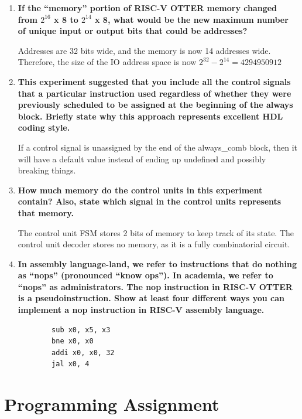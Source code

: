 \documentclass{article}
\begin{document}
\begin{enumerate}
    \item \textbf{If the “memory” portion of RISC-V OTTER memory changed from $2^{16}$ x 8 to $2^{14}$ x 8, what would
    be the new maximum number of unique input or output bits that could be addresses?}

    Addresses are 32 bits wide, and the memory is now 14 addresses wide. Therefore, the size of the IO address space 
    is now $2^{32} - 2^{14} = 4294950912$ 

    \item \textbf{This experiment suggested that you include all the control signals that a particular instruction
    used regardless of whether they were previously scheduled to be assigned at the beginning of the
    always block. Briefly state why this approach represents excellent HDL coding style.}

    If a control signal is unassigned by the end of the always\_comb block, then it will have a default value 
    instead of ending up undefined and possibly breaking things.
    
    \item \textbf{How much memory do the control units in this experiment contain? Also, state which signal in
    the control units represents that memory.}

    The control unit FSM stores 2 bits of memory to keep track of its state. The control unit 
    decoder stores no memory, as it is a fully combinatorial circuit.

    \item \textbf{In assembly language-land, we refer to instructions that do nothing as “nops” (pronounced “know
    ops”). In academia, we refer to “nops” as administrators. The nop instruction in RISC-V OTTER
    is a pseudoinstruction. Show at least four different ways you can implement a nop instruction in
    RISC-V assembly language.}

    \begin{verbatim}
        sub x0, x5, x3
        bne x0, x0 
        addi x0, x0, 32
        jal x0, 4
    \end{verbatim}

\end{enumerate}

\pagebreak

\section{Programming Assignment}
\end{document}
